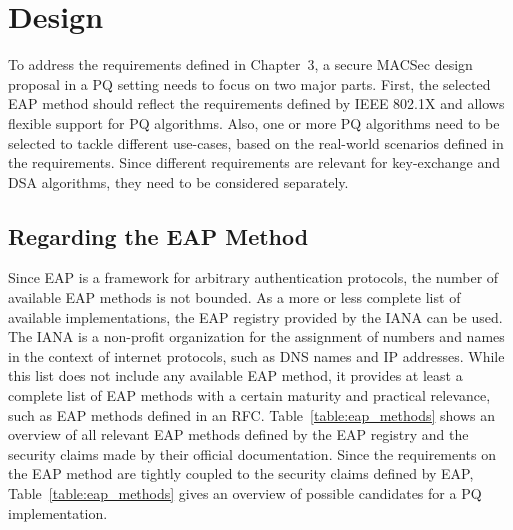 \chapter{Design}

To address the requirements defined in Chapter~3, a secure MACSec design proposal in a \ac{PQ} setting needs to focus on two major parts. First, the selected \ac{EAP} method should reflect the requirements defined by IEEE 802.1X and allows flexible support for \ac{PQ} algorithms. Also, one or more \ac{PQ} algorithms need to be selected to tackle different use-cases, based on the real-world scenarios defined in the requirements. Since different requirements are relevant for key-exchange and \ac{DSA} algorithms, they need to be considered separately.

\section{Regarding the \texorpdfstring{\ac{EAP}}{EAP} Method}

Since \ac{EAP} is a framework for arbitrary authentication protocols, the number of available \ac{EAP} methods is not bounded. As a more or less complete list of available implementations, the \ac{EAP} registry provided by the \ac{IANA} can be used. The \ac{IANA} is a non-profit organization for the assignment of numbers and names in the context of internet protocols, such as DNS names and IP addresses. While this list does not include any available \ac{EAP} method, it provides at least a complete list of \ac{EAP} methods with a certain maturity and practical relevance, such as \ac{EAP} methods defined in an \ac{RFC}. Table~\ref{table:eap_methods} shows an overview of all relevant \ac{EAP} methods defined by the \ac{EAP} registry and the security claims made by their official documentation. Since the requirements on the \ac{EAP} method are tightly coupled to the security claims defined by EAP, Table~\ref{table:eap_methods} gives an overview of possible candidates for a \ac{PQ} implementation.


